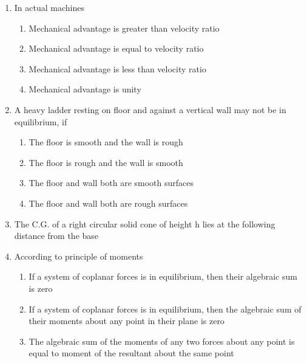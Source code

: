 \documentclass[11pt,a4paper]{article}
\begin{document}
\begin{enumerate}
\item{In actual machines}
\begin{enumerate}[label=\Alph*.]
\item{Mechanical advantage is greater than velocity ratio}
\item{Mechanical advantage is equal to velocity ratio}
\item{Mechanical advantage is less than velocity ratio}
\item{Mechanical advantage is unity}
\end{enumerate}
\item{A heavy ladder resting on floor and against a vertical wall may not be in equilibrium, if}
\begin{enumerate}[label=\Alph*.]
\item{The floor is smooth and the wall is rough}
\item{The floor is rough and the wall is smooth}
\item{The floor and wall both are smooth surfaces}
\item{The floor and wall both are rough surfaces}
\end{enumerate}
\item{The C.G. of a right circular solid cone of height h lies at the following distance from the base}
\\
\item{According to principle of moments}
\begin{enumerate}[label=\Alph*.]
\item{If a system of coplanar forces is in equilibrium, then their algebraic sum is zero}
\item{If a system of coplanar forces is in equilibrium, then the algebraic sum of their moments about any point in their plane is zero}
\item{The algebraic sum of the moments of any two forces about any point is equal to moment of the resultant about the same point}

\end{enumerate}
\end{enumerate}
\end{document}
